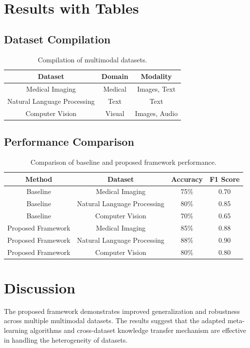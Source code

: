 \documentclass{article}
\begin{document}
\section{Results with Tables}
\subsection{Dataset Compilation}
\begin{table}[ht]
\centering
\begin{tabular}{|c|c|c|}
\hline
Dataset & Domain & Modality \\
\hline
Medical Imaging & Medical & Images, Text \\
Natural Language Processing & Text & Text \\
Computer Vision & Visual & Images, Audio \\
\hline
\end{tabular}
\caption{Compilation of multimodal datasets.}
\label{tab:dataset_compilation}
\end{table}

\subsection{Performance Comparison}
\begin{table}[ht]
\centering
\begin{tabular}{|c|c|c|c|}
\hline
Method & Dataset & Accuracy & F1 Score \\
\hline
Baseline & Medical Imaging & 75\% & 0.70 \\
Baseline & Natural Language Processing & 80\% & 0.85 \\
Baseline & Computer Vision & 70\% & 0.65 \\
Proposed Framework & Medical Imaging & 85\% & 0.88 \\
Proposed Framework & Natural Language Processing & 88\% & 0.90 \\
Proposed Framework & Computer Vision & 80\% & 0.80 \\
\hline
\end{tabular}
\caption{Comparison of baseline and proposed framework performance.}
\label{tab:performance_comparison}
\end{table}

\section{Discussion}
The proposed framework demonstrates improved generalization and robustness across multiple multimodal datasets. The results suggest that the adapted meta-learning algorithms and cross-dataset knowledge transfer mechanism are effective in handling the heterogeneity of datasets.
\end{document}
